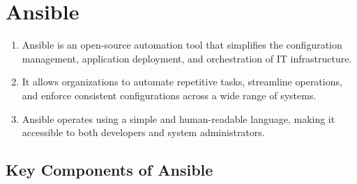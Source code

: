 \newpage

\section*{Ansible}

\begin{enumerate}
    \item Ansible is an open-source automation tool that simplifies the configuration management, application deployment, and orchestration of IT infrastructure.

    \item It allows organizations to automate repetitive tasks, streamline operations, and enforce consistent configurations across a wide range of systems.

    \item Ansible operates using a simple and human-readable language, making it accessible to both developers and system administrators.
\end{enumerate}

\subsection*{Key Components of Ansible}

